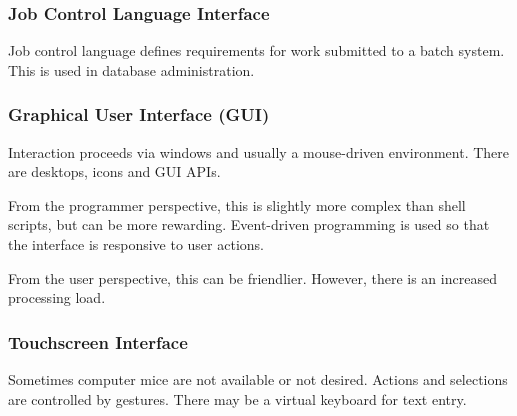 \subsubsection{Job Control Language Interface}

Job control language defines requirements for work submitted to a batch system.
This is used in database administration.

\subsubsection{Graphical User Interface (GUI)}

Interaction proceeds via windows and usually a mouse-driven environment.
There are desktops, icons and GUI APIs.

From the programmer perspective, this is slightly more complex than shell scripts, but can be more rewarding.
Event-driven programming is used so that the interface is responsive to user actions.

From the user perspective, this can be friendlier.
However, there is an increased processing load.

\subsubsection{Touchscreen Interface}

Sometimes computer mice are not available or not desired.
Actions and selections are controlled by gestures.
There may be a virtual keyboard for text entry.
